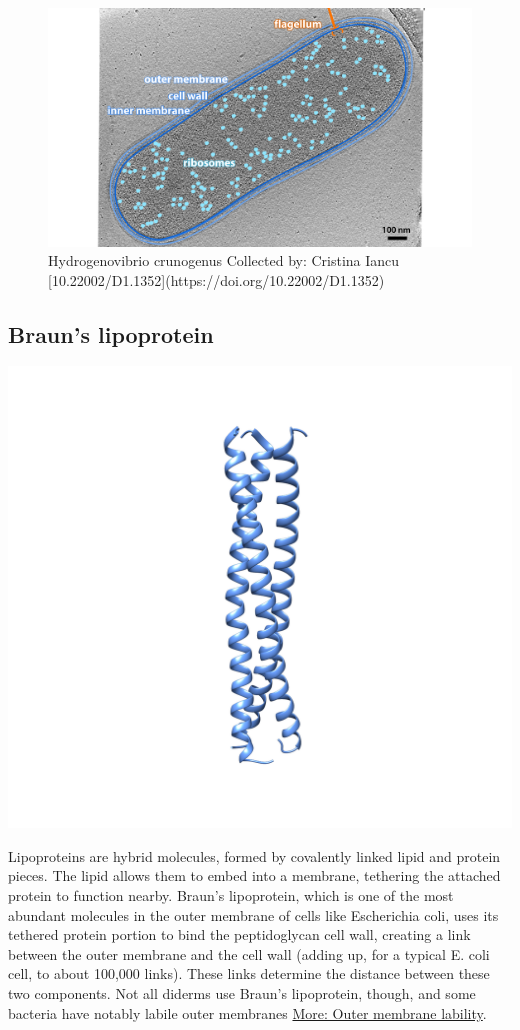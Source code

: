 \documentclass[]{tufte-book}
\begin{document}
\begin{figure}
\includegraphics{img/2_3_Hcrunogenus} \caption[Hydrogenovibrio crunogenus Collected by]{Hydrogenovibrio crunogenus Collected by: Cristina Iancu [10.22002/D1.1352](https://doi.org/10.22002/D1.1352)}\label{fig:unnamed-chunk-7}
\end{figure}

\hypertarget{Brauns_lipoprotein}{\subsection{Braun's
lipoprotein}\label{Brauns_lipoprotein}}

\includegraphics{img/02_schematic/2_3_1_BLP}

Lipoproteins are hybrid molecules, formed by covalently linked lipid and
protein pieces. The lipid allows them to embed into a membrane,
tethering the attached protein to function nearby. Braun's lipoprotein,
which is one of the most abundant molecules in the outer membrane of
cells like Escherichia coli, uses its tethered protein portion to bind
the peptidoglycan cell wall, creating a link between the outer membrane
and the cell wall (adding up, for a typical E. coli cell, to about
100,000 links). These links determine the distance between these two
components. Not all diderms use Braun's lipoprotein, though, and some
bacteria have notably labile outer membranes \protect\hyperlink{}{More:
Outer membrane lability}.
\end{document}
